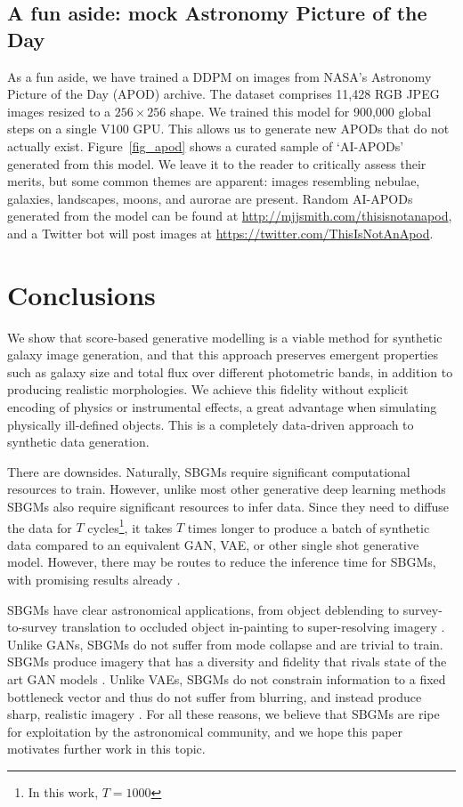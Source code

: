 \documentclass[fleqn,usenatbib]{mnras}
\begin{document}
\subsection{A fun aside: mock Astronomy Picture of the Day}

As a fun aside, we have trained a DDPM on images from NASA's Astronomy
Picture of the Day (APOD) archive. The dataset comprises 11,428 RGB JPEG
images resized to a $256\times256$ shape. We trained this model for 900,000
global steps on a single V100 GPU. This allows us to generate new APODs that do
not actually exist. Figure~\ref{fig_apod} shows a curated sample of `AI-APODs'
generated from this model. We leave it to the reader to critically assess their
merits, but some common themes are apparent: images resembling nebulae,
galaxies, landscapes, moons, and aurorae are present. Random AI-APODs generated
from the model can be found at \url{http://mjjsmith.com/thisisnotanapod}, and a
Twitter bot will post images at \url{https://twitter.com/ThisIsNotAnApod}.

\section{Conclusions} \label{sec_discussion}

We show that score-based generative modelling is a viable method for synthetic
galaxy image generation, and that this approach preserves emergent properties
such as galaxy size and total flux over different photometric bands, in addition
to producing realistic morphologies. We achieve this fidelity without
explicit encoding of physics or instrumental effects, a great advantage
when simulating physically ill-defined objects. This is a completely
data-driven approach to synthetic data generation.

There are downsides. Naturally, SBGMs require significant computational
resources to train. However, unlike most other generative deep learning methods
SBGMs also require significant resources to infer data. Since they need to
diffuse the data for $T$ cycles\footnote{In this work, $T = 1000$}, it takes
$T$ times longer to produce a batch of synthetic data compared to an equivalent
GAN, VAE, or other single shot generative model. However, there may be routes
to reduce the inference time for SBGMs, with promising results already
\citep{cite_ajm2021,cite_song2021}.

SBGMs have clear astronomical applications, from object deblending
\citep{cite_jayaram2020} to survey-to-survey translation
\citep{cite_sasaki2021} to occluded object in-painting
\citep{cite_kadkhodaie2020,cite_song2021} to super-resolving imagery
\citep{cite_saharia2021}. Unlike GANs, SBGMs do not suffer from mode collapse
and are trivial to train.  SBGMs produce imagery that has a
diversity and fidelity that rivals state of the art GAN models
\citep{cite_song2021,cite_nichol2021,cite_dhariwal2021}. Unlike VAEs,
SBGMs do not constrain information to a fixed bottleneck vector and
thus do not suffer from blurring, and instead produce sharp, realistic imagery
\citep{cite_spindler2021}. For all these reasons, we believe that SBGMs 
are ripe for exploitation by the astronomical community, and we hope 
this paper motivates further work in this topic. 
\end{document}
